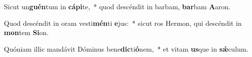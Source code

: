 \item Sicut un\textbf{guén}tum in \textbf{cá}\textbf{pi}te,~* quod descéndit in barbam, \textbf{bar}bam \textbf{A}aron.
\item Quod descéndit in oram vesti\textbf{mén}ti \textbf{e}jus:~* sicut ros Hermon, qui descéndit in \textbf{mon}tem \textbf{Si}on.
\item Quóniam illic mandávit Dóminus bene\textbf{dic}ti\textbf{ó}nem,~* et vitam \textbf{us}que in \textbf{sǽ}culum.
